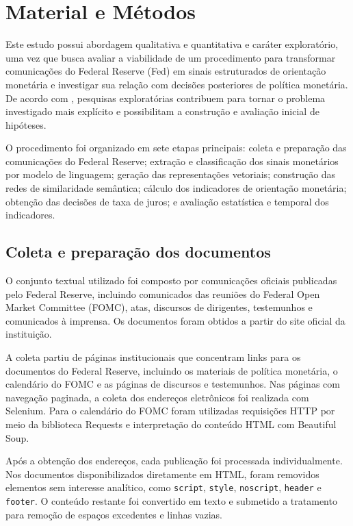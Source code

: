 \newpage
\chapter{Material e Métodos}

Este estudo possui abordagem qualitativa e quantitativa e caráter exploratório,
uma vez que busca avaliar a viabilidade de um procedimento para transformar
comunicações do Federal Reserve (Fed) em sinais estruturados de orientação
monetária e investigar sua relação com decisões posteriores de política
monetária. De acordo com \citep{gil2010elaborar}, pesquisas exploratórias
contribuem para tornar o problema investigado mais explícito e possibilitam a
construção e avaliação inicial de hipóteses.

O procedimento foi organizado em sete etapas principais: coleta e preparação
das comunicações do Federal Reserve; extração e classificação dos sinais
monetários por modelo de linguagem; geração das representações vetoriais;
construção das redes de similaridade semântica; cálculo dos indicadores de
orientação monetária; obtenção das decisões de taxa de juros; e avaliação
estatística e temporal dos indicadores.

\section{Coleta e preparação dos documentos}

O conjunto textual utilizado foi composto por comunicações oficiais publicadas
pelo Federal Reserve, incluindo comunicados das reuniões do Federal Open Market
Committee (FOMC), atas, discursos de dirigentes, testemunhos e comunicados à
imprensa. Os documentos foram obtidos a partir do site oficial da instituição.

A coleta partiu de páginas institucionais que concentram links para os
documentos do Federal Reserve, incluindo os materiais de política monetária, o
calendário do FOMC e as páginas de discursos e testemunhos. Nas páginas com
navegação paginada, a coleta dos endereços eletrônicos foi realizada com
Selenium. Para o calendário do FOMC foram utilizadas requisições HTTP por meio
da biblioteca Requests e interpretação do conteúdo HTML com Beautiful Soup.

Após a obtenção dos endereços, cada publicação foi processada individualmente.
Nos documentos disponibilizados diretamente em HTML, foram removidos elementos
sem interesse analítico, como \texttt{script}, \texttt{style},
\texttt{noscript}, \texttt{header} e \texttt{footer}. O
conteúdo restante foi convertido em texto e submetido a tratamento para remoção
de espaços excedentes e linhas vazias.

